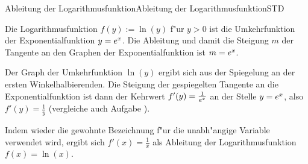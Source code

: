 \begin{MXContent}{Ableitung der Logarithmusfunktion}{Ableitung der Logarithmusfunktion}{STD}

Die Logarithmusfunktion $f(y) := \ln(y)$ f"ur $y > 0$ ist die Umkehrfunktion
der Exponentialfunktion $y = e^x$.
Die Ableitung und damit die Steigung $m$ der Tangente an den 
Graphen der Exponentialfunktion ist $m = e^x$. 

Der Graph der Umkehrfunktion $\ln(y)$ ergibt sich aus der Spiegelung an der 
ersten Winkelhalbierenden. Die Steigung der gespiegelten Tangente an die 
Exponentialfunktion ist dann der Kehrwert $f'(y) = \frac{1}{e^x}$ an der 
Stelle $y = e^x$, also $f'(y) = \frac{1}{y}$ (vergleiche auch Aufgabe
).

Indem wieder die gewohnte Bezeichnung f"ur die unabh"angige Variable verwendet
wird, ergibt sich $f'(x) = \frac{1}{x}$ als Ableitung der 
Logarithmusfunktion $f(x) = \ln(x)$.


\end{MXContent}
